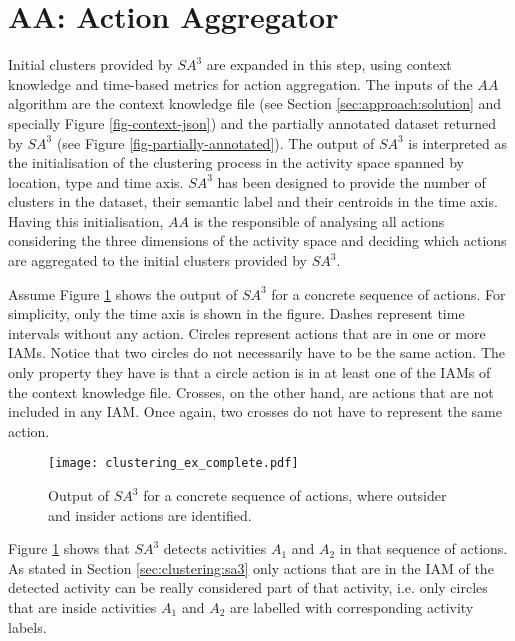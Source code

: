 \section{AA: Action Aggregator}
\label{sec:clustering:ac}

Initial clusters provided by $SA^3$ are expanded in this step, using context knowledge and time-based metrics for action aggregation. The inputs of the $AA$ algorithm are the context knowledge file (see Section \ref{sec:approach:solution} and specially Figure \ref{fig-context-json}) and the partially annotated dataset returned by $SA^3$ (see Figure \ref{fig-partially-annotated}). The output of $SA^3$ is interpreted as the initialisation of the clustering process in the activity space spanned by location, type and time axis. $SA^3$ has been designed to provide the number of clusters in the dataset, their semantic label and their centroids in the time axis. Having this initialisation, $AA$ is the responsible of analysing all actions considering the three dimensions of the activity space and deciding which actions are aggregated to the initial clusters provided by $SA^3$.

Assume Figure \ref{fig-initial-clusters} shows the output of $SA^3$ for a concrete sequence of actions. For simplicity, only the time axis is shown in the figure. Dashes represent time intervals without any action. Circles represent actions that are in one or more IAMs. Notice that two circles do not necessarily have to be the same action. The only property they have is that a circle action is in at least one of the IAMs of the context knowledge file. Crosses, on the other hand, are actions that are not included in any IAM. Once again, two crosses do not have to represent the same action. 

\begin{figure}[htbp]%
\centering
\texttt{[image: clustering\_ex\_complete.pdf]}
    \caption{Output of $SA^3$ for a concrete sequence of actions, where outsider and insider actions are identified.}
    \label{fig-initial-clusters}
\end{figure}

Figure \ref{fig-initial-clusters} shows that $SA^3$ detects activities $A_1$ and $A_2$ in that sequence of actions. As stated in Section \ref{sec:clustering:sa3} only actions that are in the IAM of the detected activity can be really considered part of that activity, i.e. only circles that are inside activities $A_1$ and $A_2$ are labelled with corresponding activity labels. 

